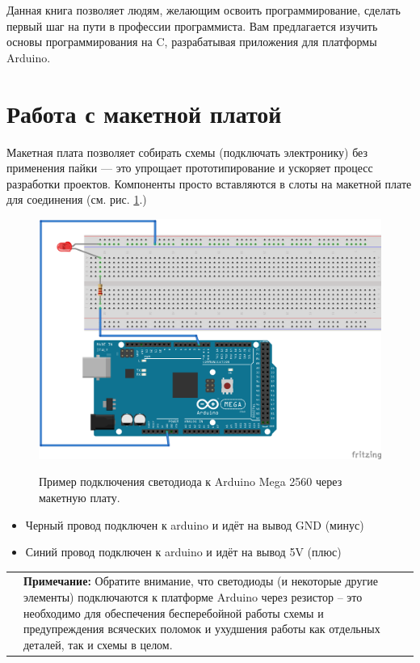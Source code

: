 \documentclass[a4paper,twoside]{book}
\newcommand{\note}[1]{
  \vspace{8pt}
  \begin{tabularx}{\textwidth}{m{1cm} m{9cm}}
    
    & \textbf{Примечание:} #1 \\
  \end{tabularx}
}
\begin{document}
Данная книга позволяет людям, желающим освоить программирование, сделать первый
шаг на пути в профессии программиста. Вам предлагается изучить основы
программирования на C, разрабатывая приложения для платформы Arduino.

\section{Работа с макетной платой}

Макетная плата позволяет собирать схемы (подключать электронику) без применения
пайки --- это упрощает прототипирование и ускоряет процесс разработки проектов.
Компоненты просто вставляются в слоты на макетной плате для соединения
(см. рис. \ref{fig:breadboard-led}.)

\begin{figure}[ht]
  \centering
  \caption{Пример подключения светодиода к Arduino Mega 2560 через макетную
    плату.}
  \includegraphics[width=12cm]{schematics/001-led}
  \label{fig:breadboard-led}
\end{figure}

\begin{itemize}
\item Черный провод подключен к arduino и идёт на вывод GND (минус)
\item Синий провод подключен к arduino и идёт на вывод 5V (плюс)
\end{itemize}

\note{ Обратите внимание, что светодиоды (и некоторые другие элементы)
  подключаются к платформе Arduino через резистор -- это необходимо для
  обеспечения бесперебойной работы схемы и предупреждения всяческих поломок и
  ухудшения работы как отдельных деталей, так и схемы в целом.  }
\end{document}
